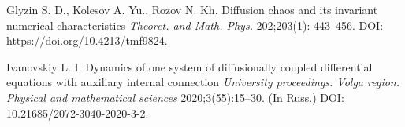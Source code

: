 \documentclass[12pt]{report}
\begin{document}

\begin{thebibliography}{9}

Glyzin S. D., Kolesov A. Yu., Rozov N. Kh. Diffusion chaos and its invariant numerical characteristics {\it Theoret. and Math. Phys.} 202;203(1): 443–456. DOI: https://doi.org/10.4213/tmf9824. 

Ivanovskiy L. I. Dynamics of one system of diffusionally coupled differential equations with auxiliary internal connection {\it University proceedings. Volga region. Physical and mathematical sciences} 2020;3(55):15–30. (In Russ.) DOI: 10.21685/2072-3040-2020-3-2.

\end{thebibliography}
\end{document}
